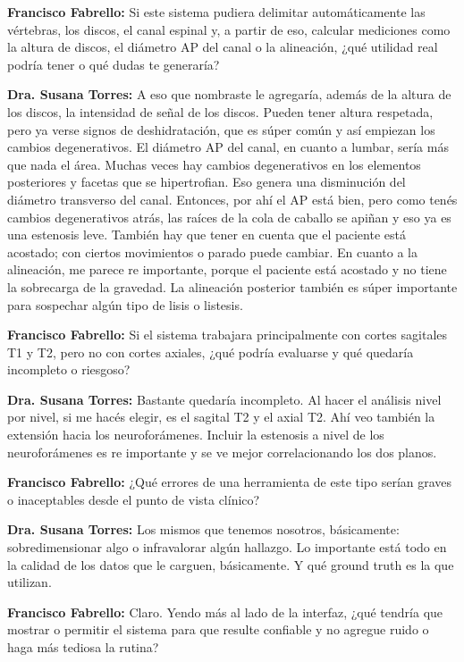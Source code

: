 \noindent\textbf{Francisco Fabrello:} Si este sistema pudiera delimitar automáticamente las vértebras, los discos, el canal espinal y, a partir de eso, calcular mediciones como la altura de discos, el diámetro AP del canal o la alineación, ¿qué utilidad real podría tener o qué dudas te generaría?

\noindent\textbf{Dra. Susana Torres:} A eso que nombraste le agregaría, además de la altura de los discos, la intensidad de señal de los discos. Pueden tener altura respetada, pero ya verse signos de deshidratación, que es súper común y así empiezan los cambios degenerativos. El diámetro AP del canal, en cuanto a lumbar, sería más que nada el área. Muchas veces hay cambios degenerativos en los elementos posteriores y facetas que se hipertrofian. Eso genera una disminución del diámetro transverso del canal. Entonces, por ahí el AP está bien, pero como tenés cambios degenerativos atrás, las raíces de la cola de caballo se apiñan y eso ya es una estenosis leve. También hay que tener en cuenta que el paciente está acostado; con ciertos movimientos o parado puede cambiar. En cuanto a la alineación, me parece re importante, porque el paciente está acostado y no tiene la sobrecarga de la gravedad. La alineación posterior también es súper importante para sospechar algún tipo de lisis o listesis.

\noindent\textbf{Francisco Fabrello:} Si el sistema trabajara principalmente con cortes sagitales T1 y T2, pero no con cortes axiales, ¿qué podría evaluarse y qué quedaría incompleto o riesgoso?

\noindent\textbf{Dra. Susana Torres:} Bastante quedaría incompleto. Al hacer el análisis nivel por nivel, si me hacés elegir, es el sagital T2 y el axial T2. Ahí veo también la extensión hacia los neuroforámenes. Incluir la estenosis a nivel de los neuroforámenes es re importante y se ve mejor correlacionando los dos planos.

\noindent\textbf{Francisco Fabrello:} ¿Qué errores de una herramienta de este tipo serían graves o inaceptables desde el punto de vista clínico?

\noindent\textbf{Dra. Susana Torres:} Los mismos que tenemos nosotros, básicamente: sobredimensionar algo o infravalorar algún hallazgo. Lo importante está todo en la calidad de los datos que le carguen, básicamente. Y qué ground truth es la que utilizan.

\noindent\textbf{Francisco Fabrello:} Claro. Yendo más al lado de la interfaz, ¿qué tendría que mostrar o permitir el sistema para que resulte confiable y no agregue ruido o haga más tediosa la rutina?


